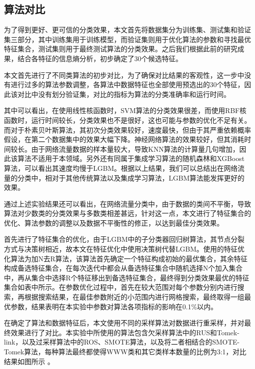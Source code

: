 \documentclass[a4papper]{article}
\begin{document}
\subsection{算法对比}
\par\setlength{\parindent}{2em} %
为了得到更好、更可信的分类效果，本文首先将数据集分为训练集、测试集和验证集三部分，其中训练集用于训练模型，而验证集则用于优化算法的参数和寻找最优特征集合，测试集则用于最终测试算法的分类效果。之后我们根据此前的研究成果，结合各特征的信息熵分析，初步确定了30个候选特征。
\par\setlength{\parindent}{2em} %
本文首先进行了不同类算法的初步对比，为了确保对比结果的客观性，这一步中没有进行过多的算法参数调整，各算法中数据特征也全部使用预选出的30个特征，因此该对比中没有划分验证集，对比的指标为算法的分类准确率和运行时间。
\par\setlength{\parindent}{2em} %
其中可以看出，在使用线性核函数时，SVM算法的分类效果很差，而使用RBF核函数时，运行时间较长，分类效果也不是很好，这也可能与参数的优化不足有关。而对于朴素贝叶斯算法，其初次分类效果较好，速度最快，但由于其严重依赖概率假设，在第二个数据集中的效果大幅下降。神经网络算法的效果较好，但其消耗时间较长。由于网络流量数据的样本量较大，导致KNN算法的计算量几句增加，因此该算法不适用于本领域。另外还有同属于集成学习算法的随机森林和XGBoost算法，可以看出其速度均慢于LGBM。根据以上结果，我们可以总结出在网络流量的分类中，相对于其他传统算法以及集成学习算法，LGBM算法能发挥更好的效果。
\par\setlength{\parindent}{2em} %
通过上述实验结果还可以看出，在网络流量分类中，由于数据的类间不平衡，导致算法对少数类的分类效果与多数类相差甚远，针对这一点，本文进行了特征集合的优化、算法参数的调整以及数据不平衡性的修正，以达到最佳分类效果。
\par\setlength{\parindent}{2em} %
首先进行了特征集合的优化，由于LGBM中的子分类器回归树算法，其节点分裂方式与决策树相近，故本文在特征优化中使用决策树代替LGBM。使用的特征优化算法为加N去R算法，该算法首先确定一个特征构成初始的最优集合，其余特征构成备选特征集合，在每次迭代中都会从备选特征集合中随机选择N个加入集合中，再从集合中选择R个特征移出到备选特征集合，最终得到分类效果最优的特征集合如表中所示。在参数优化过程中，首先在较大范围对每个参数分别内进行搜索，再根据搜索结果，在最佳参数附近的小范围内进行网格搜索，最终取得一组最优参数，结果表明在本实验中参数对算法各项指标的影响在0.1\%以内。
\par\setlength{\parindent}{2em} %
在确定了算法和数据特征后，本文使用不同的采样算法对数据进行重采样，并对最终效果进行了对比。本实验中所使用的算法包含欠采样算法中的RUS和Tomek-link，以及过采样算法中的ROS、SMOTE算法，以及将二者相结合的SMOTE-Tomek算法，每种算法最终都使得WWW类和其它类样本数量的比例为3:1，对比结果如图所示 。
\end{document}
